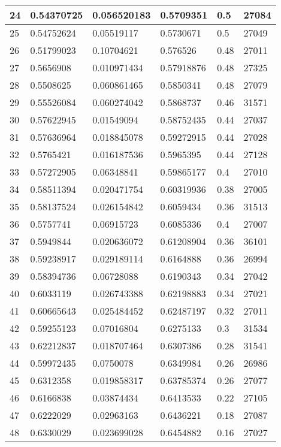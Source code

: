 \begin{longtable}{|l|l|l|l|l|l|}
24 & 0.54370725 & 0.056520183 & 0.5709351 & 0.5 & 27084 \\ \hline 
25 & 0.54752624 & 0.05519117 & 0.5730671 & 0.5 & 27049 \\ \hline 
26 & 0.51799023 & 0.10704621 & 0.576526 & 0.48 & 27011 \\ \hline 
27 & 0.5656908 & 0.010971434 & 0.57918876 & 0.48 & 27325 \\ \hline 
28 & 0.5508625 & 0.060861465 & 0.5850341 & 0.48 & 27079 \\ \hline 
29 & 0.55526084 & 0.060274042 & 0.5868737 & 0.46 & 31571 \\ \hline 
30 & 0.57622945 & 0.01549094 & 0.58752435 & 0.44 & 27037 \\ \hline 
31 & 0.57636964 & 0.018845078 & 0.59272915 & 0.44 & 27028 \\ \hline 
32 & 0.5765421 & 0.016187536 & 0.5965395 & 0.44 & 27128 \\ \hline 
33 & 0.57272905 & 0.06348841 & 0.59865177 & 0.4 & 27010 \\ \hline 
34 & 0.58511394 & 0.020471754 & 0.60319936 & 0.38 & 27005 \\ \hline 
35 & 0.58137524 & 0.026154842 & 0.6059434 & 0.36 & 31513 \\ \hline 
36 & 0.5757741 & 0.06915723 & 0.6085336 & 0.4 & 27007 \\ \hline 
37 & 0.5949844 & 0.020636072 & 0.61208904 & 0.36 & 36101 \\ \hline 
38 & 0.59238917 & 0.029189114 & 0.6164888 & 0.36 & 26994 \\ \hline 
39 & 0.58394736 & 0.06728088 & 0.6190343 & 0.34 & 27042 \\ \hline 
40 & 0.6033119 & 0.026743388 & 0.62198883 & 0.34 & 27021 \\ \hline 
41 & 0.60665643 & 0.025484452 & 0.62487197 & 0.32 & 27011 \\ \hline 
42 & 0.59255123 & 0.07016804 & 0.6275133 & 0.3 & 31534 \\ \hline 
43 & 0.62212837 & 0.018707464 & 0.6307386 & 0.28 & 31541 \\ \hline 
44 & 0.59972435 & 0.0750078 & 0.6349984 & 0.26 & 26986 \\ \hline 
45 & 0.6312358 & 0.019858317 & 0.63785374 & 0.26 & 27077 \\ \hline 
46 & 0.6166838 & 0.03874434 & 0.6413533 & 0.22 & 27105 \\ \hline 
47 & 0.6222029 & 0.02963163 & 0.6436221 & 0.18 & 27087 \\ \hline 
48 & 0.6330029 & 0.023699028 & 0.6454882 & 0.16 & 27027 \\ \hline 

\end{longtable}
